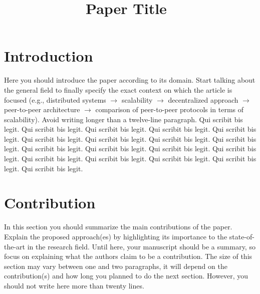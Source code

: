 \documentclass[conference]{IEEEtran}
\begin{document}
\title{\Large{Paper Title}~\cite{EWD:EWD447pub}} %

\author{
	
}

\maketitle

% 
% 
% 
% 
\section{Introduction}
\label{sec:intro}

Here you should introduce the paper according to its domain. Start talking about the general field to finally specify the exact context on which the article is focused (e.g., distributed systems $\rightarrow$ scalability $\rightarrow$ decentralized approach $\rightarrow$ peer-to-peer architecture $\rightarrow$ comparison of peer-to-peer protocols in terms of scalability). Avoid writing longer than a twelve-line paragraph. Qui scribit bis legit. Qui scribit bis legit. Qui scribit bis legit. Qui scribit bis legit. Qui scribit bis legit. Qui scribit bis legit. Qui scribit bis legit. Qui scribit bis legit. Qui scribit bis legit. Qui scribit bis legit. Qui scribit bis legit. Qui scribit bis legit. Qui scribit bis legit. Qui scribit bis legit. Qui scribit bis legit. Qui scribit bis legit. Qui scribit bis legit. Qui scribit bis legit. 


% 
% 
% 
% 
\section{Contribution}
\label{sec:contrib}

In this section you should summarize the main contributions of the paper. Explain the proposed approach(es) by highlighting its importance to the state-of-the-art in the research field. Until here, your manuscript should be a summary, so focus on explaining what the authors claim to be a contribution. The size of this section may vary between one and two paragraphs, it will depend on the contribution(s) and how long you planned to do the next section. However, you should not write here more than twenty lines.
\end{document}
